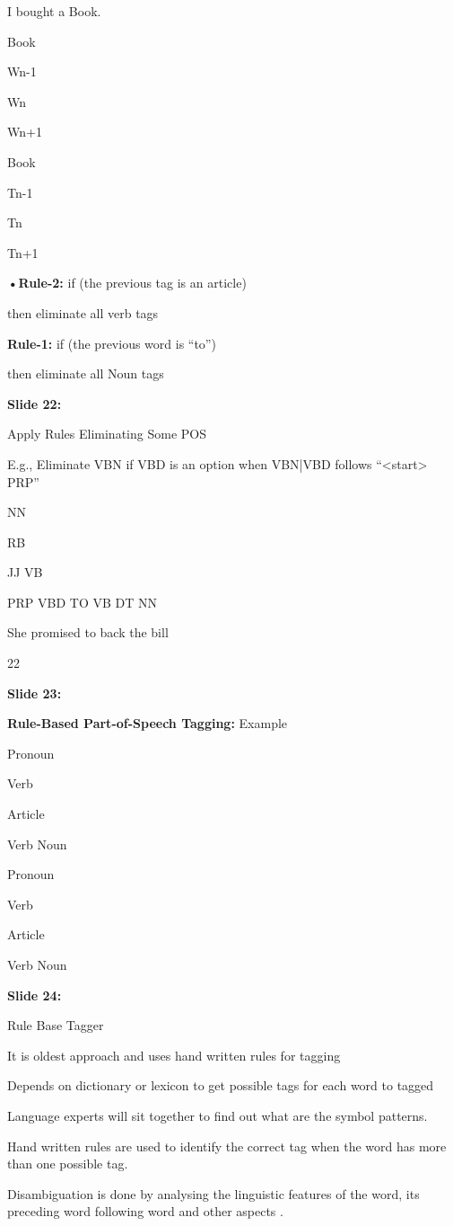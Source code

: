 \documentclass[11pt,a4paper]{article}
\begin{document}
I bought a Book.

Book

Wn-1

Wn

Wn+1

Book

Tn-1

Tn

Tn+1

\textbf{•Rule-2:}  if (the previous tag is an article)

then eliminate all verb tags

\textbf{Rule-1:}  if (the previous word is “to”)

then eliminate all Noun tags

\textbf{Slide 22:}

Apply Rules Eliminating Some POS

E.g., Eliminate VBN if VBD is an option when VBN|VBD follows “<start> PRP”

NN

RB

JJ			VB

PRP	VBD		TO	VB		DT	NN

She	promised	to	back 		the	bill

22

\textbf{Slide 23:}

\textbf{Rule-Based Part-of-Speech Tagging:}  Example

Pronoun

Verb

Article

Verb     Noun

Pronoun

Verb

Article

Verb     Noun

\textbf{Slide 24:}

Rule Base Tagger

It is oldest approach and uses hand written rules for tagging

Depends on dictionary or lexicon to get possible tags for each word to tagged

Language experts will sit together to find out what are the symbol patterns.

Hand written rules are used to identify the correct tag when the word has more than one possible tag.

Disambiguation is done by analysing the linguistic features of the word, its preceding word following word and other aspects .
\end{document}
